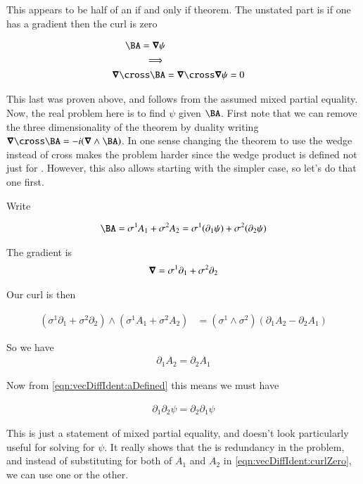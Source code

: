 This appears to be half of an if and only if theorem.  The unstated part is if one has a gradient then the curl is zero

\begin{align*}
\BA = \spacegrad \psi \\
\implies \\
\spacegrad \cross \BA &= \spacegrad \cross \spacegrad \psi = 0
\end{align*}

This last was proven above, and follows from the assumed mixed partial equality.  Now, the real problem here is to find $\psi$ given $\BA$.
First note that we can remove the three dimensionality of the theorem by duality writing $\spacegrad \cross \BA = -i (\spacegrad \wedge \BA)$.
In one sense changing the theorem to use the wedge instead of cross makes the problem harder since the wedge product is defined not just
for .  However, this also allows starting with the simpler  case, so let's do that one first.

Write

\begin{align}\label{eqn:vecDiffIdent:aDefined}
\BA = \sigma^1 A_1 + \sigma^2 A_2 = \sigma^1 (\partial_1 \psi) + \sigma^2 (\partial_2 \psi)
\end{align}

The gradient is
\begin{align*}
\boldsymbol{\nabla} = \sigma^1 \partial_1 + \sigma^2 \partial_2
\end{align*}

Our curl is then

\begin{align*}
(\sigma^1 \partial_1 + \sigma^2 \partial_2) \wedge (\sigma^1 A_1 + \sigma^2 A_2) 
&=
(\sigma^1 \wedge \sigma^2) (\partial_1 A_2 - \partial_2 A_1)
\end{align*}

So we have
\begin{align}\label{eqn:vecDiffIdent:curlZero}
\partial_1 A_2 = \partial_2 A_1
\end{align}

Now from \ref{eqn:vecDiffIdent:aDefined} this means we must have

\begin{align}
\partial_1 \partial_2 \psi = \partial_2 \partial_1 \psi
\end{align}

This is just a statement of mixed partial equality, and doesn't look particularly useful for solving for $\psi$.  It really shows that the
is redundancy in the problem, and instead of substituting for both of $A_1$ and $A_2$
in \ref{eqn:vecDiffIdent:curlZero}, we can use one or the other.

